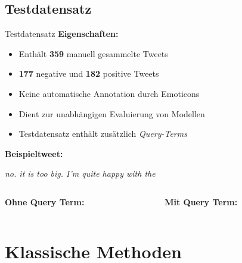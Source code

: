 \documentclass[aspectratio=169]{beamer} %
\begin{document}
\subsection{Testdatensatz}

\begin{frame}{Testdatensatz}
  \textbf{Eigenschaften:}
  \begin{itemize}
      \item Enthält \textbf{359} manuell gesammelte Tweets
      \item \textbf{177} negative und \textbf{182} positive Tweets
      \item Keine automatische Annotation durch Emoticons
      \item Dient zur unabhängigen Evaluierung von Modellen
      \item Testdatensatz enthält zusätzlich \textit{Query-Terms}
  \end{itemize}

  \vspace{0.5cm}
  \textbf{Beispieltweet:}


  \begin{center}
    \glqq \textit{no. it is too big. I'm quite happy with the \grqq}
    \vspace{0.25cm}
    \begin{columns}
        \begin{column}{0.45\textwidth}
            \textbf{Ohne Query Term: }
        \end{column}
        \begin{column}{0.45\textwidth}
            \textbf{Mit Query Term: }
        \end{column}
    \end{columns}
  \end{center}
\end{frame}


\section{Klassische Methoden}
\end{document}
